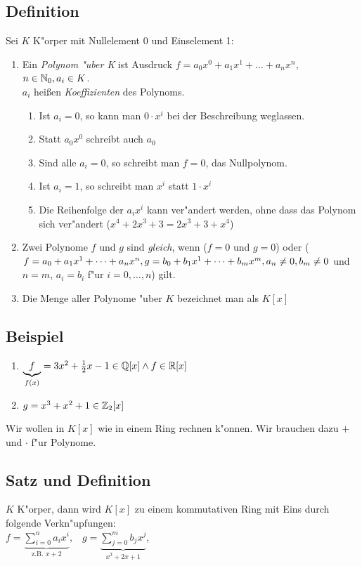 \subsection[Definition: Polynom]{Definition}
Sei $K$ K"orper mit Nullelement $0$ und Einselement 1:
{\renewcommand{\labelenumi}{(\roman{enumi})}\begin{enumerate}
	\item
	Ein \emph{Polynom "uber K} ist Ausdruck $f=a_0x^0+a_1x^1+\dots + a_nx^n$, $n\in \mathbb{N}_0, a_i\in K$.\\
	$a_i$ heißen \emph{Koeffizienten} des Polynoms.
	\begin{enumerate}
		\item
		Ist $a_i=0$, so kann man $0 \cdot x^i$ bei der Beschreibung weglassen.
		\item
		Statt $a_0x^0$ schreibt auch $a_0$
		\item
		Sind alle $a_i=0$, so schreibt man $f=0$, das Nullpolynom.
		\item
		Ist $a_i =1$, so schreibt man $x^i$ statt $1 \cdot x^i$
		\item
		Die Reihenfolge der $a_ix^i$ kann ver"andert werden, ohne dass das Polynom sich ver"andert ($x^4+2x^3 + 3= 2x^3 +  3 + x^4$)
	\end{enumerate} 
	\item
	Zwei Polynome $f$ und $g$ sind \emph{gleich}, wenn ($f=0$ und $g=0$) oder (${f=a_0 + a_1x^1+ \dots + a_nx^n},\\ {g=b_0+b_1x^1+ \dots + b_mx^m}, {a_n \neq  0, b_m \neq 0}$ und $n=m$, ${a_i = b_i}$ f"ur $i=0, \dots , n$) gilt.
	\item
	Die	Menge aller Polynome "uber $K$ bezeichnet man als $K[x]$
\end{enumerate} }

\subsection{Beispiel}
\begin{enumerate}
	\item
	$\underbrace{f}_{f(x)} = 3x^2 + \frac{1}{2}x -1 \in \mathbb{Q} [x] \land f \in \mathbb{R} [x]$
	\item
	$g= x^3 + x^2 +1 \in \mathbb{Z}_2[x] $ 
\end{enumerate}
Wir wollen in $K[x]$ wie in einem Ring rechnen k"onnen. Wir brauchen dazu $+$ und $\cdot$ f"ur Polynome.

\subsection[Satz und Definition: Polynomring]{Satz und Definition}
$K$ K"orper, dann wird $K[x]$ zu einem kommutativen Ring mit Eins durch folgende Verkn"upfungen:\\
$f= \underbrace{\sum_{i=0}^{n} a_ix^i}_{\text{z.B. }x+2}, \;\;\;g=\underbrace{\sum_{j=0}^{m} b_j x^j}_{x^3 + 2x + 1}$,

